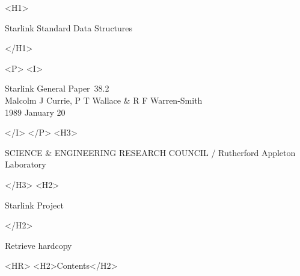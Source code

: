 \documentclass[twoside,11pt]{article}
\newcommand{\stardoccategory}  {Starlink General Paper}
\newcommand{\stardocnumber}    {38.2}
\newcommand{\stardocsource}    {sgp\stardocnumber}
\newcommand{\stardocauthors}   {Malcolm J Currie, P T Wallace \&
                                R F Warren-Smith}
\newcommand{\stardocdate}      {1989 January 20}
\newcommand{\stardoctitle}     {Starlink Standard Data Structures}
\newcommand{\htmladdnormallink}[2]{#1}
\newcommand{\htmladdimg}[1]{}
\newcommand{\htmlref}[2]{#1}
\newcommand{\htmladdtonavigation}[1]{}
\newcommand{\xlabel}[1]{}
\newcommand{\latexonlytoc}[0]{\tableofcontents}
\begin{document}
\begin{htmlonly}
   \xlabel{}
   \begin{rawhtml} <H1> \end{rawhtml}
      \stardoctitle
   \begin{rawhtml} </H1> \end{rawhtml}


   \begin{rawhtml} <P> <I> \end{rawhtml}
   \stardoccategory\ \stardocnumber \\
   \stardocauthors \\
   \stardocdate
   \begin{rawhtml} </I> </P> <H3> \end{rawhtml}
      SCIENCE \& ENGINEERING RESEARCH COUNCIL /
      \htmladdnormallink{Rutherford Appleton Laboratory}
                        {http://www.cclrc.ac.uk/ral} \\
   \begin{rawhtml} </H3> <H2> \end{rawhtml}
      \htmladdnormallink{Starlink Project}{http://star-www.rl.ac.uk/}
   \begin{rawhtml} </H2> \end{rawhtml}
   \htmladdnormallink{\htmladdimg{source.gif} Retrieve hardcopy}
      {http://star-www.rl.ac.uk/cgi-bin/hcserver?\stardocsource}\\

  \label{stardoccontents}
  \begin{rawhtml} 
    <HR>
    <H2>Contents</H2>
  \end{rawhtml}
  \newcommand{\latexonlytoc}[0]{}
  \htmladdtonavigation{\htmlref{\htmladdimg{contents_motif.gif}}
        {stardoccontents}}


\end{htmlonly}
\end{document}
